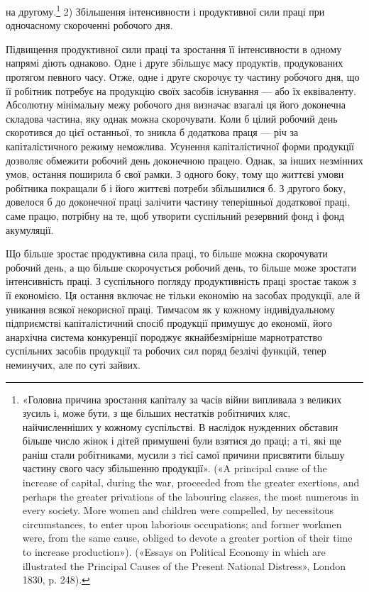 на другому.\footnote{
«Головна причина зростання капіталу за часів війни випливала
з великих зусиль і, може бути, з ще більших нестатків робітничих кляс,
найчисленніших у кожному суспільстві. В наслідок нужденних обставин
більше число жінок і дітей примушені були взятися до праці; а ті, які
ще раніш стали робітниками, мусили з тієї самої причини присвятити
більшу частину свого часу збільшенню продукції». («A principal cause
of the increase of capital, during the war, proceeded from the greater exertions,
and perhaps the greater privations of the labouring classes, the most
numerous in every society. More women and children were compelled, by
necessitous circumstances, to enter upon laborious occupations; and former
workmen were, from the same cause, obliged to devote a greater portion
of their time to increase production»). («Essays on Political Economy in
which are illustrated the Principal Causes of the Present National Distress»,
London 1830, p. 248).
}
2) Збільшення інтенсивности і продуктивної сили праці при
одночасному скороченні робочого дня.

Підвищення продуктивної сили праці та зростання її інтенсивности
в одному напрямі діють однаково. Одне і друге збільшує
масу продуктів, продукованих протягом певного часу. Отже,
одне і друге скорочує ту частину робочого дня, що її робітник
потребує на продукцію своїх засобів існування — або їх еквіваленту.
Абсолютну мінімальну межу робочого дня визначає
взагалі ця його доконечна складова частина, яку однак можна
скорочувати. Коли б цілий робочий день скоротився до цієї останньої,
то зникла б додаткова праця — річ за капіталістичного
режиму неможлива. Усунення капіталістичної форми продукції
дозволяє обмежити робочий день доконечною працею. Однак, за
інших незмінних умов, остання поширила б свої рамки. З одного
боку, тому що життєві умови робітника покращали б і його життєві
потреби збільшилися б. З другого боку, довелося б до доконечної
праці залічити частину теперішньої додаткової праці,
саме працю, потрібну на те, щоб утворити суспільний резервний
фонд і фонд акумуляції.

Що більше зростає продуктивна сила праці, то більше можна
скорочувати робочий день, а що більше скорочується робочий
день, то більше може зростати інтенсивність праці. З суспільного
погляду продуктивність праці зростає також з її економією. Ця
остання включає не тільки економію на засобах продукції, але й
уникання всякої некорисної праці. Тимчасом як у кожному індивідуальному
підприємстві капіталістичний спосіб продукції примушує
до економії, його анархічна система конкуренції породжує
якнайбезмірніше марнотратство суспільних засобів продукції
та робочих сил поряд безлічі функцій, тепер неминучих, але по
суті зайвих.

